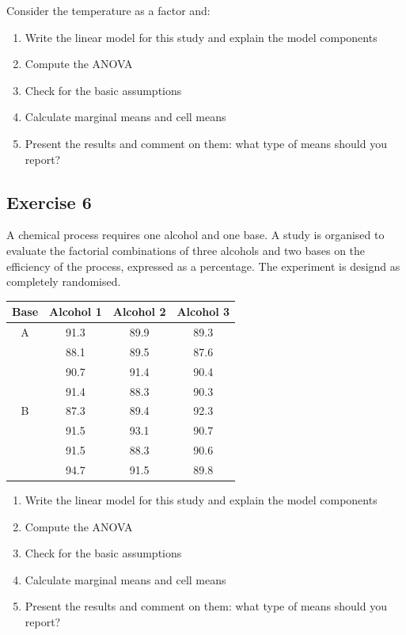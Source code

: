 \documentclass[a4paper,12pt,oneside]{book}
\providecommand{\tightlist}{%
  \setlength{\itemsep}{0pt}\setlength{\parskip}{0pt}}
\begin{document}
Consider the temperature as a factor and:

\begin{enumerate}
\def\labelenumi{\arabic{enumi}.}
\tightlist
\item
  Write the linear model for this study and explain the model components
\item
  Compute the ANOVA
\item
  Check for the basic assumptions
\item
  Calculate marginal means and cell means
\item
  Present the results and comment on them: what type of means should you report?
\end{enumerate}

\hypertarget{exercise-6}{%
\subsection{Exercise 6}\label{exercise-6}}

A chemical process requires one alcohol and one base. A study is organised to evaluate the factorial combinations of three alcohols and two bases on the efficiency of the process, expressed as a percentage. The experiment is designd as completely randomised.

\begin{longtable}[]{@{}cccc@{}}
\toprule
Base & Alcohol 1 & Alcohol 2 & Alcohol 3 \\
\midrule
\endhead
A & 91.3 & 89.9 & 89.3 \\
& 88.1 & 89.5 & 87.6 \\
& 90.7 & 91.4 & 90.4 \\
& 91.4 & 88.3 & 90.3 \\
B & 87.3 & 89.4 & 92.3 \\
& 91.5 & 93.1 & 90.7 \\
& 91.5 & 88.3 & 90.6 \\
& 94.7 & 91.5 & 89.8 \\
\bottomrule
\end{longtable}

\begin{enumerate}
\def\labelenumi{\arabic{enumi}.}
\tightlist
\item
  Write the linear model for this study and explain the model components
\item
  Compute the ANOVA
\item
  Check for the basic assumptions
\item
  Calculate marginal means and cell means
\item
  Present the results and comment on them: what type of means should you report?
\end{enumerate}
\end{document}
